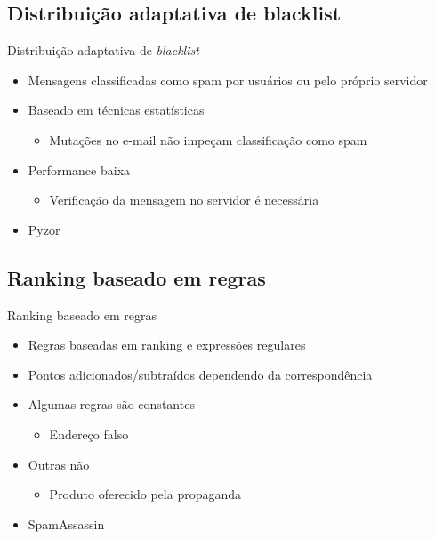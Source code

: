 \documentclass[dvipdfm]{beamer}
\begin{document}
\subsection{Distribuição adaptativa de blacklist}
\begin{frame}{Distribuição adaptativa de \emph{blacklist}}
	\begin{itemize}
		\item Mensagens classificadas como spam por usuários ou pelo próprio servidor
		\item Baseado em técnicas estatísticas
		\begin{itemize}
			\item Mutações no e-mail não impeçam classificação como spam
		\end{itemize}
		\item Performance baixa
		\begin{itemize}
			\item Verificação da mensagem no servidor é necessária
		\end{itemize}
		\item Pyzor
	\end{itemize}
\end{frame}

\subsection{Ranking baseado em regras}
\begin{frame}{Ranking baseado em regras}
	\begin{itemize}
		\item Regras baseadas em ranking e expressões regulares
		\item Pontos adicionados/subtraídos dependendo da correspondência
		\item Algumas regras são constantes
		\begin{itemize}
			\item Endereço falso
		\end{itemize}
		\item Outras não
		\begin{itemize}
			\item Produto oferecido pela propaganda
		\end{itemize}
		\item SpamAssassin
	\end{itemize}
\end{frame}
\end{document}
